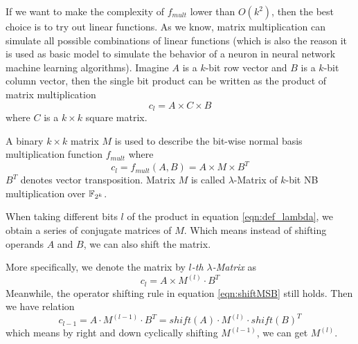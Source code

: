 If we want to make the complexity of $f_{mult}$ lower than $O(k^2)$, then the best choice is to try out 
linear functions. As we know, matrix multiplication can simulate all possible combinations of 
linear functions (which is also the reason it is used as basic model to simulate the behavior of a neuron
in neural network machine learning algorithms). Imagine $A$ is a $k$-bit row vector and $B$ is a $k$-bit 
column vector, then the single bit product can be written as the product of matrix multiplication
$$c_{l} = A\times C\times B$$
where $C$ is a $k\times k$ square matrix.

\begin{Definition}
A binary $k\times k$ matrix $M$ is used to describe the bit-wise normal basis multiplication function $f_{mult}$ where
\begin{equation}
\label{eqn:def_lambda}
c_{l} = f_{mult}(A, B) = A \times M \times B^T
\end{equation}
$B^T$ denotes vector transposition. Matrix $M$ is called $\lambda$-Matrix of
$k$-bit NB multiplication over ${\mathbb{F}}_{2^k}$.
\end{Definition} 

When taking different bits $l$ of the product in equation \ref{eqn:def_lambda}, 
we obtain a series of conjugate matrices of $M$. 
Which means instead of shifting operands $A$ and $B$, we can also shift the 
matrix.

More specifically, we denote the matrix by \emph{$l$-th $\lambda$-Matrix} as 
$$c_l = A \times M^{(l)} \cdot B^T$$
Meanwhile, the operator shifting rule in equation \ref{eqn:shiftMSB} still holds. Then we have relation 
$$c_{l-1} = A \cdot M^{(l-1)} \cdot B^T = shift(A) \cdot M^{(l)} \cdot shift(B)^T$$ which means
by right and down cyclically shifting $M^{(l-1)}$, we can get $M^{(l)}$.

